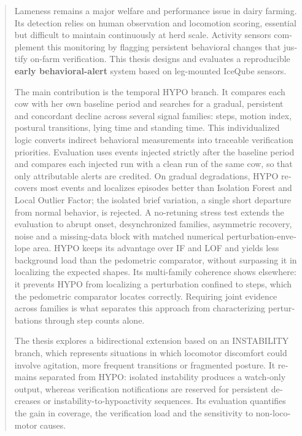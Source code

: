 \begin{otherlanguage}{english}
\renewcommand{\abstractname}{Abstract}
\begin{abstract}
\noindent
Lameness remains a major welfare and performance issue in dairy farming. Its detection relies on
human observation and locomotion scoring, essential but difficult to maintain continuously at
herd scale. Activity sensors complement this monitoring by flagging persistent behavioral
changes that justify on-farm verification. This thesis designs and evaluates a reproducible
\textbf{early behavioral-alert} system based on leg-mounted IceQube sensors.

The main contribution is the temporal HYPO branch. It compares each cow with her own baseline
period and searches for a gradual, persistent and concordant decline across several signal
families: steps, motion index, postural transitions, lying time and standing time. This
individualized logic converts indirect behavioral measurements into traceable verification priorities.
Evaluation uses events injected strictly after the baseline period and compares each injected
run with a clean run of the same cow, so that only attributable alerts are credited. On gradual
degradations, HYPO recovers most events and localizes episodes better than Isolation Forest and
Local Outlier Factor; the isolated brief variation, a single short departure from normal behavior, is rejected. A no-retuning stress test
extends the evaluation to abrupt onset, desynchronized families, asymmetric recovery, noise and
a missing-data block with matched numerical perturbation-envelope area. HYPO keeps its advantage
over IF and LOF and yields less background load than the pedometric comparator, without
surpassing it in localizing the expected shapes. Its multi-family coherence shows elsewhere: it
prevents HYPO from localizing a perturbation confined to steps, which the pedometric comparator
locates correctly. Requiring joint evidence across families is what separates this approach from
characterizing perturbations through step counts alone.

The thesis explores a bidirectional extension based on an INSTABILITY branch, which
represents situations in which locomotor discomfort could involve agitation, more frequent
transitions or fragmented posture. It remains separated from HYPO: isolated instability
produces a watch-only output, whereas verification notifications are reserved for persistent
decreases or instability-to-hypoactivity sequences. Its evaluation quantifies the gain in
coverage, the verification load and the sensitivity to non-locomotor causes.


\end{abstract}
\end{otherlanguage}
